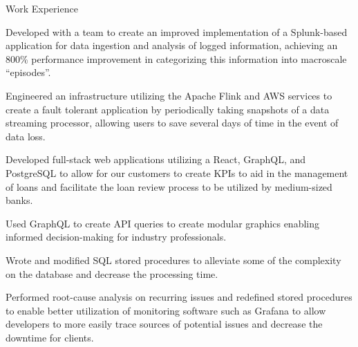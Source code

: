 \documentclass{resume} %
\begin{document}

\begin{workSection}{Work Experience}
    \experienceItem[
        company=Splunk,
        location=San Jose{,} CA,
        position=Backend Software Engineer Intern,
        duration=May 2023\textendash{July 2023}
    ]
     \begin{bullets}
        \item Developed with a team to create an improved implementation of a Splunk-based application for data ingestion and analysis of logged information, achieving an 800\% performance improvement in categorizing this information into macroscale ``episodes''.
        \item Engineered an infrastructure utilizing the Apache Flink and AWS services to create a fault tolerant application by periodically taking snapshots of a data streaming processor, allowing users to save several days of time in the event of data loss.
     \end{bullets}
     
    \experienceItem[
        company=QwickRate,
        location=Marietta{,} GA (Remote),
        position=Software Engineer Intern,
        duration=August 2022\textendash{April 2023}
    ]
    \begin{bullets}
        \item Developed full-stack web applications utilizing a React, GraphQL, and PostgreSQL to allow for our customers to create KPIs to aid in the management of loans and facilitate the loan review process to be utilized by medium-sized banks.
        \item Used GraphQL to create API queries to create modular graphics enabling informed decision-making for industry professionals.
     \end{bullets}

     \experienceItem[
        company=Ultimate Kronos Group (UKG),
        location=Atlanta{,} GA,
        position=Full-stack Software Engineer Intern,
        duration=January 2022\textendash{August 2022},
     ]
     \begin{bullets}
        \item Wrote and modified SQL stored procedures to alleviate some of the complexity on the database and decrease the processing time.
        \item Performed root-cause analysis on recurring issues and redefined stored procedures to enable better utilization of monitoring software such as Grafana to allow developers to more easily trace sources of potential issues and decrease the downtime for clients.
     \end{bullets}
     
\end{workSection}
\end{document}
